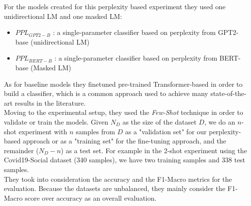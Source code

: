 \documentclass[10pt, english]{report}
\begin{document}
For the models created for this perplexity based experiment they used one unidirectional LM and one masked LM:

\begin{itemize}
\item $PPL_{GPT2-B}$ : a single-parameter classifier based on perplexity from GPT2-base \cite{radford2019language} (unidirectional LM)
\item $PPL_{BERT-B}$ : a single-parameter classifier based on perplexity from BERT-base \cite{devlin2018bert} (Masked LM)
\end{itemize}

As for baseline models they finetuned pre-trained Transformer-based \cite{vaswani2017attention} in order to build a classifier, which is a common approach used to achieve many state-of-the-art results in the literature.\\

Moving to the experimental setup, they used the \textit{Few-Shot} technique in order to validate or train the models. Given $N_D$ as the size of the dataset $D$, we do an $n$-shot experiment with $n$ samples from $D$ as a "validation set" for our perplexity-based approach or as a "training set" for the fine-tuning approach, and the remainder ($N_D - n$) as a test set. For example in the 2-shot experiment using the Covid19-Social dataset (340 samples), we have two training samples and 338 test samples.\\
They took into consideration the accuracy and the F1-Macro metrics for the evaluation. Because the datasets are unbalanced, they mainly consider the F1-Macro score over accuracy as an overall evaluation.\\
\end{document}
